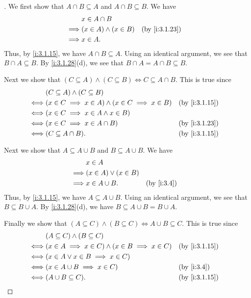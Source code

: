 \begin{proof}[]
  We first show that \(A \cap B \subseteq A\) and \(A \cap B \subseteq B\).
  We have
  \begin{align*}
             & x \in A \cap B                               \\
    \implies & (x \in A) \land (x \in B) &  & \by{i:3.1.23} \\
    \implies & x \in A.
  \end{align*}
  Thus, by \cref{i:3.1.15}, we have \(A \cap B \subseteq A\).
  Using an identical argument, we see that \(B \cap A \subseteq B\).
  By \cref{i:3.1.28}(d), we see that \(B \cap A = A \cap B \subseteq B\).

  Next we show that \((C \subseteq A) \land (C \subseteq B) \iff C \subseteq A \cap B\).
  This is true since
  \begin{align*}
         & (C \subseteq A) \land (C \subseteq B)                                          \\
    \iff & (x \in C \implies x \in A) \land (x \in C \implies x \in B) &  & \by{i:3.1.15} \\
    \iff & (x \in C \implies x \in A \land x \in B)                                       \\
    \iff & (x \in C \implies x \in A \cap B)                           &  & \by{i:3.1.23} \\
    \iff & (C \subseteq A \cap B).                                     &  & \by{i:3.1.15}
  \end{align*}

  Next we show that \(A \subseteq A \cup B\) and \(B \subseteq A \cup B\).
  We have
  \begin{align*}
             & x \in A                                  \\
    \implies & (x \in A) \lor (x \in B)                 \\
    \implies & x \in A \cup B.          &  & \by{i:3.4}
  \end{align*}
  Thus, by \cref{i:3.1.15}, we have \(A \subseteq A \cup B\).
  Using an identical argument, we see that \(B \subseteq B \cup A\).
  By \cref{i:3.1.28}(d), we have \(B \subseteq A \cup B = B \cup A\).

  Finally we show that \((A \subseteq C) \land (B \subseteq C) \iff A \cup B \subseteq C\).
  This is true since
  \begin{align*}
         & (A \subseteq C) \land (B \subseteq C)                                          \\
    \iff & (x \in A \implies x \in C) \land (x \in B \implies x \in C) &  & \by{i:3.1.15} \\
    \iff & (x \in A \lor x \in B \implies x \in C)                                        \\
    \iff & (x \in A \cup B \implies x \in C)                           &  & \by{i:3.4}    \\
    \iff & (A \cup B \subseteq C).                                     &  & \by{i:3.1.15}
  \end{align*}
\end{proof}

